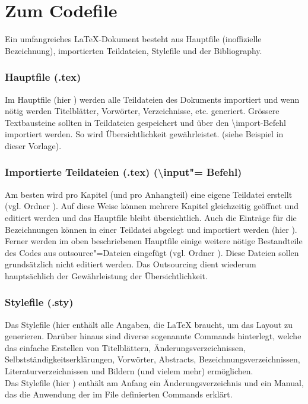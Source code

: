 %
\section{Zum Codefile}%
%
Ein umfangreiches \LaTeX -Dokument besteht aus Hauptfile (inoffizielle Bezeichnung), importierten Teildateien, Stylefile und der Bibliography.%
%
\subsubsection{Hauptfile (.tex)}%
%
Im Hauptfile (hier ) werden alle Teildateien des Dokuments importiert und wenn nötig werden Titelblätter, Vorwörter, Verzeichnisse, etc. generiert. Grössere Textbausteine sollten in Teildateien gespeichert und über den \textbackslash import-Befehl importiert werden. So wird Übersichtlichkeit gewährleistet. (siehe Beispiel in dieser Vorlage).%
%
\subsubsection{Importierte Teildateien (.tex) (\textbackslash input"= Befehl)}%
%
Am besten wird pro Kapitel (und pro Anhangteil) eine eigene Teildatei erstellt (vgl. Ordner ). Auf diese Weise können mehrere Kapitel gleichzeitig geöffnet und editiert werden und das Hauptfile bleibt übersichtlich. Auch die Einträge für die Bezeichnungen können in einer Teildatei abgelegt und importiert werden (hier ).\\%
Ferner werden im oben beschriebenen Hauptfile einige weitere nötige Bestandteile des Codes aus outsource"=Dateien eingefügt (vgl. Ordner ). Diese Dateien sollen grundsätzlich nicht editiert werden. Das Outsourcing dient wiederum hauptsächlich der Gewährleistung der Übersichtlichkeit.%
%
\subsubsection{Stylefile (.sty)}%
%
Das Stylefile (hier  enthält alle Angaben, die \LaTeX{} braucht, um das Layout zu generieren. Darüber hinaus sind diverse sogenannte Commands hinterlegt, welche das einfache Erstellen von Titelblättern, Änderungsverzeichnissen, Selbstständigkeitserklärungen, Vorwörter, Abstracts, Bezeichnungsverzeichnissen, Literaturverzeichnissen und Bildern (und vielem mehr) ermöglichen. \\ %
Das Stylefile (hier ) enthält am Anfang ein Änderungsverzeichnis und ein Manual, das die Anwendung der im File definierten Commands erklärt.%
%

